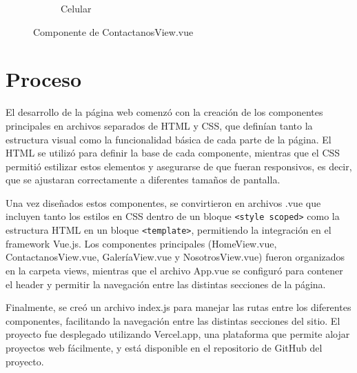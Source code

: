 \begin{figure} [H]
\begin{subfigure}{0.4\textwidth}
                        \caption{Celular}
                        \label{fig:pw5.2}
                    \end{subfigure}
                    \hfill
                            
                    \caption{Componente de ContactanosView.vue}
                    \label{fig:pw5}
                    \end{figure}
                    
    \section{Proceso}
        El desarrollo de la página web comenzó con la creación de los componentes principales en archivos separados de HTML y CSS, que definían tanto la estructura visual como la funcionalidad básica de cada parte de la página. El HTML se utilizó para definir la base de cada componente, mientras que el CSS permitió estilizar estos elementos y asegurarse de que fueran responsivos, es decir, que se ajustaran correctamente a diferentes tamaños de pantalla.\par
        Una vez diseñados estos componentes, se convirtieron en archivos .vue que incluyen tanto los estilos en CSS dentro de un bloque \texttt{<style scoped>} como la estructura HTML en un bloque \texttt{<template>}, permitiendo la integración en el framework Vue.js. Los componentes principales (HomeView.vue, ContactanosView.vue, GaleríaView.vue y NosotrosView.vue) fueron organizados en la carpeta views, mientras que el archivo App.vue se configuró para contener el header y permitir la navegación entre las distintas secciones de la página.\par
        Finalmente, se creó un archivo index.js para manejar las rutas entre los diferentes componentes, facilitando la navegación entre las distintas secciones del sitio. El proyecto fue desplegado utilizando Vercel.app, una plataforma que permite alojar proyectos web fácilmente, y está disponible en el repositorio de GitHub del proyecto.\par